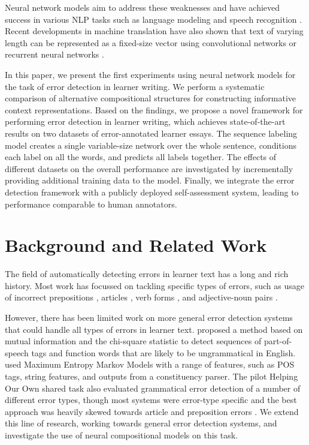 \documentclass[11pt]{article}
\begin{document}
Neural network models aim to address these weaknesses and have achieved success in various NLP tasks such as language modeling \cite{Bengio2003} and speech recognition \cite{Dahl2012}.
Recent developments in machine translation have also shown that text of varying length can be represented as a fixed-size vector using convolutional networks \cite{Kalchbrenner2013,Cho2014} or recurrent neural networks \cite{Cho2014a,Bahdanau2015}. 

In this paper, we present the first experiments using neural network models for the task of error detection in learner writing.
We perform a systematic comparison of alternative compositional structures for constructing informative context representations.
Based on the findings, we propose a novel framework for performing error detection in learner writing, which achieves state-of-the-art results on two datasets of error-annotated learner essays.
The sequence labeling model creates a single variable-size network over the whole sentence, conditions each label on all the words, and predicts all labels together.
The effects of different datasets on the overall performance are investigated by incrementally providing additional training data to the model.
Finally, we integrate the error detection framework with a publicly deployed self-assessment system, leading to performance comparable to human annotators.





\section{Background and Related Work}

The field of automatically detecting errors in learner text has a long and rich history.
Most work has focussed on tackling specific types of errors, such as usage of incorrect prepositions \cite{Tetreault2008,Chodorow2007}, articles \cite{Han2004,Han2006}, verb forms \cite{Lee2008}, and adjective-noun pairs \cite{Kochmar2014}. 


However, there has been limited work on more general error detection systems that could handle all types of errors in learner text.
 proposed a method based on mutual information and the chi-square statistic to detect sequences of part-of-speech tags and function words that are likely to be ungrammatical in English.
 used Maximum Entropy Markov Models with a range of features, such as POS tags, string features, and outputs from a constituency parser. 
The pilot Helping Our Own shared task \cite{Dale2011} also evaluated grammatical error detection of a number of different error types, though most systems were error-type specific and the best approach was heavily skewed towards article and preposition errors \cite{Rozovskaya2011}.  
We extend this line of research, working towards general error detection systems, and investigate the use of neural compositional models on this task.
\end{document}
